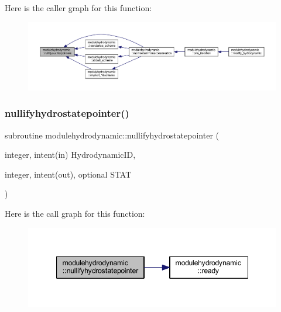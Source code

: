 Here is the caller graph for this function\+:\nopagebreak
\begin{figure}[H]
\begin{center}
\leavevmode
\includegraphics[width=350pt]{namespacemodulehydrodynamic_a43c5994c86b411881eec077d6376cb07_icgraph}
\end{center}
\end{figure}
\mbox{\label{namespacemodulehydrodynamic_a3c9ae88187f7c83938a730ba2aecc5b4}} 
\subsubsection{\texorpdfstring{nullifyhydrostatepointer()}{nullifyhydrostatepointer()}}
{\footnotesize\ttfamily subroutine modulehydrodynamic\+::nullifyhydrostatepointer (\begin{DoxyParamCaption}\item[{integer, intent(in)}]{Hydrodynamic\+ID,  }\item[{integer, intent(out), optional}]{S\+T\+AT }\end{DoxyParamCaption})\hspace{0.3cm}{\ttfamily [private]}}

Here is the call graph for this function\+:\nopagebreak
\begin{figure}[H]
\begin{center}
\leavevmode
\includegraphics[width=347pt]{namespacemodulehydrodynamic_a3c9ae88187f7c83938a730ba2aecc5b4_cgraph}
\end{center}
\end{figure}
\mbox{\label{namespacemodulehydrodynamic_a054b8ffaff698f4cc430c2f7f0bc0da9}} 
